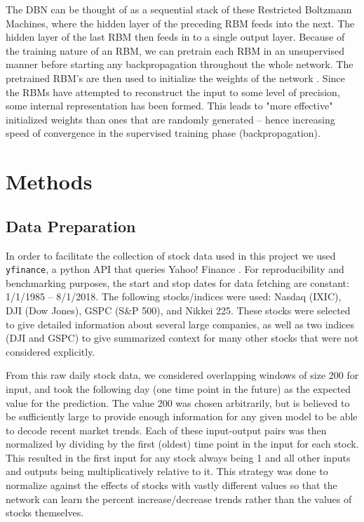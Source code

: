 \documentclass[conference]{IEEEtran}
\begin{document}
The DBN can be thought of as a sequential stack of these Restricted Boltzmann Machines, where the hidden layer of the preceding RBM feeds into the next.
The hidden layer of the last RBM then feeds in to a single output layer.
Because of the training nature of an RBM, we can pretrain each RBM in an unsupervised manner before starting any backpropagation throughout the whole network.
The pretrained RBM's are then used to initialize the weights of the network \cite{NIPS2006}.
Since the RBMs have attempted to reconstruct the input to some level of precision, some internal representation has been formed.
This leads to "more effective" initialized weights than ones that are randomly generated -- hence increasing speed of convergence in the supervised training phase (backpropagation).

\section{Methods}

\subsection{Data Preparation}
In order to facilitate the collection of stock data used in this project we used \texttt{yfinance}, a python API that queries Yahoo! Finance \cite{yfinanceapi}.
For reproducibility and benchmarking purposes, the start and stop dates for data fetching are constant: 1/1/1985 -- 8/1/2018.
The following stocks/indices were used: Nasdaq (IXIC), DJI (Dow Jones), GSPC (S\&P 500), and Nikkei 225.
These stocks were selected to give detailed information about several large companies, as well as two indices (DJI and GSPC) to give summarized context for many other stocks that were not considered explicitly.

From this raw daily stock data, we considered overlapping windows of size 200 for input, and took the following day (one time point in the future) as the expected value for the prediction.
The value 200 was chosen arbitrarily, but is believed to be sufficiently large to provide enough information for any given model to be able to decode recent market trends.
Each of these input-output pairs was then normalized by dividing by the first (oldest) time point in the input for each stock.
This resulted in the first input for any stock always being 1 and all other inputs and outputs being multiplicatively relative to it.
This strategy was done to normalize against the effects of stocks with vastly different values so that the network can learn the percent increase/decrease trends rather than the values of stocks themselves.
\end{document}
